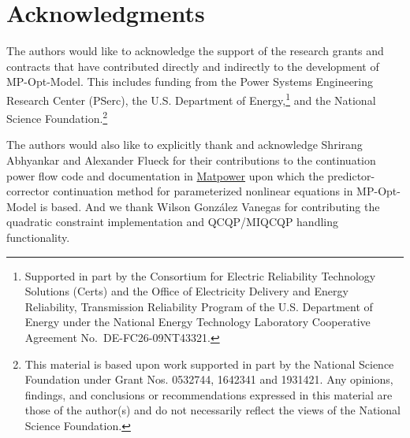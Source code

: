 \documentclass[12pt]{article}
\newcommand{\matpower}[0]{{\sc Matpower}}
\newcommand{\matpowerurl}[0]{https://matpower.org}
\newcommand{\matpowerlink}[0]{\href{\matpowerurl}{\matpower{}}}
\newcommand{\mpom}[0]{\mbox{MP-Opt-Model}}
\newcommand{\pserc}[0]{{\sc PSerc}}
\newcommand{\PSERC}[0]{{Power Systems Engineering Research Center (\pserc{})}}
\newcommand{\certs}[0]{{\sc Certs}}
\newcommand{\CERTS}[0]{{Consortium for Electric Reliability Technology Solutions (\certs{})}}
\numberwithin{equation}{section}
\numberwithin{table}{section}
\numberwithin{figure}{section}
\begin{document}
\section{Acknowledgments}
The authors would like to acknowledge the support of the research grants and contracts that have contributed directly and indirectly to the development of \mpom{}. This includes funding from the \PSERC{}, the U.S. Department of Energy,\footnote{Supported in part by the \CERTS{} and the Office of Electricity Delivery and Energy Reliability, Transmission Reliability Program of the U.S. Department of Energy under the National Energy Technology Laboratory Cooperative Agreement No.~DE-FC26-09NT43321.} and the National Science Foundation.\footnote{This material is based upon work supported in part by the National Science Foundation under Grant Nos. 0532744, 1642341 and 1931421. Any opinions, findings, and conclusions or recommendations expressed in this material are those of the author(s) and do not necessarily reflect the views of the National Science Foundation.}

The authors would also like to explicitly thank and acknowledge Shrirang Abhyankar and Alexander Flueck for their contributions to the continuation power flow code and documentation in \matpowerlink{} upon which the predictor-corrector continuation method for parameterized nonlinear equations in \mpom{} is based. And we thank Wilson Gonz{\'a}lez Vanegas for contributing the quadratic constraint implementation and QCQP/MIQCQP handling functionality.
\end{document}
